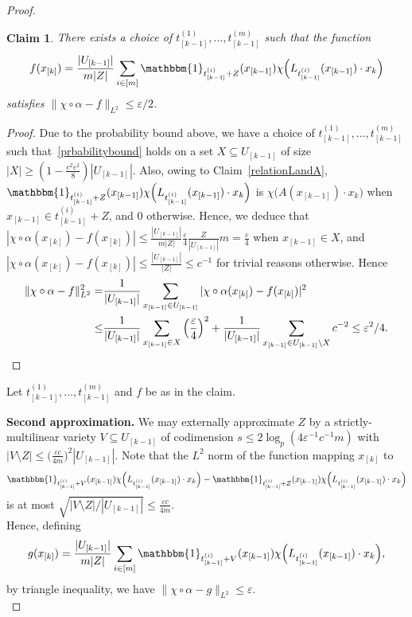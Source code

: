 \documentclass[a4paper,11pt]{article}
\newtheorem{claim}[theorem]{Claim}
\theoremstyle{definition}
\newcommand\id{\mathbbm{1}}
\begin{document}
\begin{proof}
    \begin{claim}
        There exists a choice of $t^{(1)}_{[k-1]}, \dots, t^{(m)}_{[k-1]}$ such that the function 
        \[f(x_{[k]}) = \frac{|U_{[k-1]}|}{m |Z|} \sum_{i \in [m]} \id_{t^{(i)}_{[k-1]} + Z}(x_{[k-1]}) \chi\Big(L_{t^{(i)}_{[k-1]}}(x_{[k-1]}) \cdot x_k\Big)\]
        satisfies $\| \chi \circ \alpha - f\|_{L^2} \leq \varepsilon/2$.
    \end{claim}

    \begin{proof}
        Due to the probability bound above, we have a choice of $t^{(1)}_{[k-1]}, \dots, t^{(m)}_{[k-1]}$ such that~\eqref{prbabilitybound} holds on a set $X \subseteq U_{[k-1]}$ of size $|X| \geq (1 - \frac{c^2\varepsilon^2}{8})|U_{[k-1]}|$. Also, owing to Claim~\ref{relationLandA}, $\id_{t^{(i)}_{[k-1]} + Z}(x_{[k-1]}) \chi\Big(L_{t^{(i)}_{[k-1]}}(x_{[k-1]}) \cdot x_k\Big)$ is $\chi\Big(A(x_{[k-1]}) \cdot x_k\Big)$ when $x_{[k-1]} \in t^{(i)}_{[k-1]} + Z$, and 0 otherwise. Hence, we deduce that $|\chi \circ \alpha(x_{[k]}) - f(x_{[k]})| \leq \frac{|U_{[k-1]}|}{m |Z|} \frac{\varepsilon}{4} \frac{Z}{|U_{[k-1]}|}m = \frac{\varepsilon}{4}$ when $x_{[k-1]} \in X$, and $|\chi \circ \alpha(x_{[k]}) - f(x_{[k]})| \leq \frac{|U_{[k-1]}|}{|Z|} \leq c^{-1}$ for trivial reasons otherwise. Hence
        \begin{align*}\| \chi \circ \alpha - f\|_{L^2}^2 = &\frac{1}{|U_{[k-1]}|} \sum_{x_{[k-1]} \in U_{[k-1]}} |\chi \circ \alpha(x_{[k]}) - f(x_{[k]})|^2\\
        \leq &\frac{1}{|U_{[k-1]}|}\sum_{x_{[k-1]} \in X} \Big(\frac{\varepsilon}{4}\Big)^2 + \frac{1}{|U_{[k-1]}|}\sum_{x_{[k-1]} \in U_{[k-1]} \setminus X}c^{-2} \leq \varepsilon^2/4.\qedhere\end{align*}
    \end{proof}
    
    \vspace{\baselineskip}


    Let $t^{(1)}_{[k-1]}, \dots, t^{(m)}_{[k-1]}$ and $f$ be as in the claim.\\

    \vspace{\baselineskip}

    \noindent\textbf{Second approximation.} We may externally approximate $Z$ by a strictly-multilinear variety $V \subseteq U_{[k-1]}$ of codimension $s \leq 2\log_p (4\varepsilon^{-1} c^{-1} m)$ with $|V \setminus Z| \leq \Big(\frac{\varepsilon c}{4m}\Big)^2|U_{[k-1]}|$. Note that the $L^2$ norm of the function mapping $x_{[k]}$ to  
    \[\id_{t^{(i)}_{[k-1]} + V}(x_{[k-1]}) \chi\Big(L_{t^{(i)}_{[k-1]}}(x_{[k-1]}) \cdot x_k\Big) - \id_{t^{(i)}_{[k-1]} + Z}(x_{[k-1]}) \chi\Big(L_{t^{(i)}_{[k-1]}}(x_{[k-1]}) \cdot x_k\Big)\]
    is at most $\sqrt{|V \setminus Z|/|U_{[k-1]}|} \leq \frac{\varepsilon c}{4m}$.\\
    \indent Hence, defining 
    \[g(x_{[k]}) = \frac{|U_{[k-1]}|}{m |Z|} \sum_{i \in [m]} \id_{t^{(i)}_{[k-1]} + V}(x_{[k-1]}) \chi\Big(L_{t^{(i)}_{[k-1]}}(x_{[k-1]}) \cdot x_k\Big),\]
    by triangle inequality, we have $\| \chi \circ \alpha - g\|_{L^2} \leq \varepsilon$.\\


\end{proof}
\end{document}
